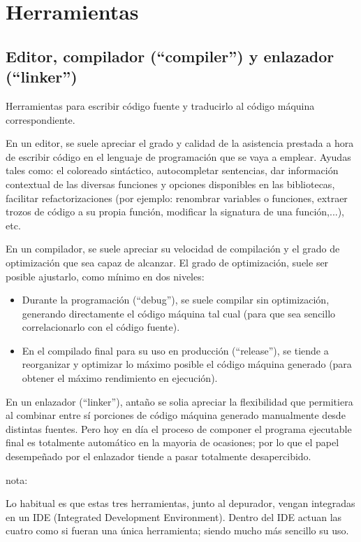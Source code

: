 \documentclass[spanish,12pt,a4paper,final,oneside]{book}
\begin{document}
\hypersetup{linkcolor=black}
\tableofcontents


\chapter{Herramientas}
\section{Editor, compilador (``compiler'') y enlazador (``linker'')}
Herramientas para escribir código fuente y traducirlo al código máquina correspondiente.

En un editor, se suele apreciar el grado y calidad de la asistencia prestada a hora de escribir código en el lenguaje de programación que se vaya a emplear. Ayudas tales como: el coloreado sintáctico, autocompletar sentencias, dar información contextual de las diversas funciones y opciones disponibles en las bibliotecas, facilitar refactorizaciones (por ejemplo: renombrar variables o funciones, extraer trozos de código a su propia función, modificar la signatura de una función,...), etc.

En un compilador, se suele apreciar su velocidad de compilación y el grado de optimización que sea capaz de alcanzar. El grado de optimización, suele ser posible ajustarlo, como mínimo en dos niveles:
\begin{itemize}
\item Durante la programación (``debug''), se suele compilar sin optimización, generando directamente el código máquina tal cual (para que sea sencillo correlacionarlo con el código fuente). 
\item En el compilado final para su uso en producción (``release''), se tiende a reorganizar y optimizar lo máximo posible el código máquina generado (para obtener el máximo rendimiento en ejecución).
\end{itemize}

En un enlazador (``linker''), antaño se solia apreciar la flexibilidad que permitiera al combinar entre sí porciones de código máquina generado manualmente desde distintas fuentes. Pero hoy en día el proceso de componer el programa ejecutable final es totalmente automático en la mayoria de ocasiones; por lo que el papel desempeñado por el enlazador tiende a pasar totalmente desapercibido.

\vspace{1cm}
nota:

Lo habitual es que estas tres herramientas, junto al depurador, vengan integradas en un IDE (Integrated Development Environment). Dentro del IDE actuan las cuatro como si fueran una única herramienta; siendo mucho más sencillo su uso.
\end{document}
